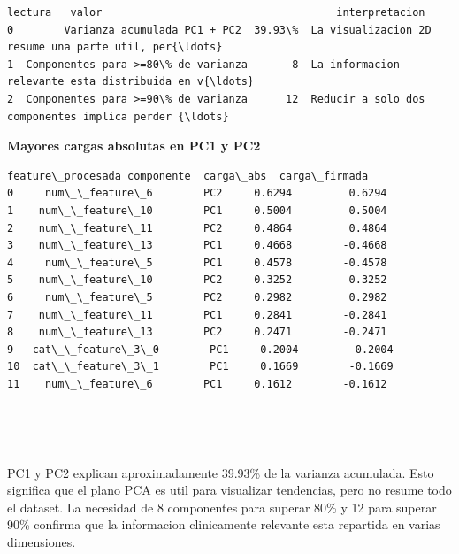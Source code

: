 \documentclass[11pt]{article}
\begin{document}
    \begin{Verbatim}[commandchars=\\\{\}]
                              lectura   valor                                     interpretacion
0        Varianza acumulada PC1 + PC2  39.93\%  La visualizacion 2D resume una parte util, per{\ldots}
1  Componentes para >=80\% de varianza       8  La informacion relevante esta distribuida en v{\ldots}
2  Componentes para >=90\% de varianza      12  Reducir a solo dos componentes implica perder {\ldots}
    \end{Verbatim}

    
    \textbf{Mayores cargas absolutas en PC1 y PC2}

    
    
    \begin{Verbatim}[commandchars=\\\{\}]
   feature\_procesada componente  carga\_abs  carga\_firmada
0     num\_\_feature\_6        PC2     0.6294         0.6294
1    num\_\_feature\_10        PC1     0.5004         0.5004
2    num\_\_feature\_11        PC2     0.4864         0.4864
3    num\_\_feature\_13        PC1     0.4668        -0.4668
4     num\_\_feature\_5        PC1     0.4578        -0.4578
5    num\_\_feature\_10        PC2     0.3252         0.3252
6     num\_\_feature\_5        PC2     0.2982         0.2982
7    num\_\_feature\_11        PC1     0.2841        -0.2841
8    num\_\_feature\_13        PC2     0.2471        -0.2471
9   cat\_\_feature\_3\_0        PC1     0.2004         0.2004
10  cat\_\_feature\_3\_1        PC1     0.1669        -0.1669
11    num\_\_feature\_6        PC1     0.1612        -0.1612
    \end{Verbatim}

    
    \begin{center}
    \end{center}
    { \hspace*{\fill} \\}
    
    \begin{center}
    \end{center}
    { \hspace*{\fill} \\}
    
    PC1 y PC2 explican aproximadamente 39.93\% de la varianza acumulada.
Esto significa que el plano PCA es util para visualizar tendencias, pero
no resume todo el dataset. La necesidad de 8 componentes para superar
80\% y 12 para superar 90\% confirma que la informacion clinicamente
relevante esta repartida en varias dimensiones.
\end{document}

